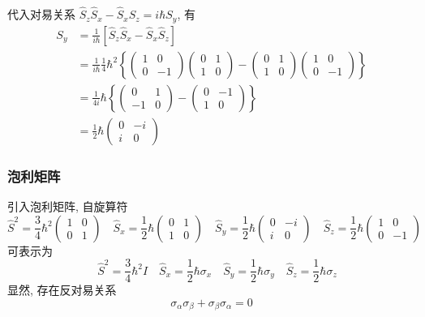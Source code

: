 \begin{frame}[label=current]
  \frametitle{}
代入对易关系 $ \hat{S}_z \hat{S}_x - \hat{S}_x \hat{S}_z = i\hbar S_y  $, 有
\[\begin{aligned}
  S_y &= \frac{1}{i\hbar} \left[\hat{S}_z \hat{S}_x - \hat{S}_x \hat{S}_z\right] \\
  &= \frac{1}{i\hbar} \frac{1}{4}\hbar^2 \left\{\begin{pmatrix}
    1 & 0\\
    0 & -1
   \end{pmatrix}\begin{pmatrix}
    0 & 1\\
    1 & 0
   \end{pmatrix}- \begin{pmatrix}
    0 & 1\\
    1 & 0
   \end{pmatrix} \begin{pmatrix}
    1 & 0\\
    0 & -1
   \end{pmatrix}\right\} \\
   &=\frac{1}{4i} \hbar \left\{\begin{pmatrix} 
    0 & 1\\
    -1 & 0
   \end{pmatrix}  - \begin{pmatrix} 
    0 & -1\\
    1 & 0
   \end{pmatrix} \right\} \\
   &= \frac{1}{2}\hbar \begin{pmatrix} 
    0 & -i\\
    i & 0
   \end{pmatrix}
\end{aligned}\]
\end{frame} 

\begin{frame}[label=current]
  \frametitle{泡利矩阵}
  引入泡利矩阵, 自旋算符
  \[\hat{S}^2 = \frac{3}{4}\hbar^2\begin{pmatrix}
    1 & 0\\
    0 & 1
   \end{pmatrix} \quad \hat{S}_x = \frac{1}{2}\hbar\begin{pmatrix}
    0 & 1\\
    1 & 0
   \end{pmatrix}\quad \hat{S}_y = \frac{1}{2}\hbar\begin{pmatrix}
    0 & -i\\
    i & 0
   \end{pmatrix}  \quad \hat{S}_z = \frac{1}{2}\hbar\begin{pmatrix}
    1 & 0\\
    0 & -1
   \end{pmatrix} \]
   可表示为 
   \[\quad \hat{S}^2 = \frac{3}{4}\hbar^2 I \quad \hat{S}_x = \frac{1}{2}\hbar\sigma _x \quad \hat{S}_y = \frac{1}{2}\hbar \sigma _y  \quad \hat{S}_z = \frac{1}{2}\hbar \sigma _z \]
   显然, 存在反对易关系
   \[\sigma _\alpha \sigma _\beta + \sigma _\beta \sigma _\alpha =0 \]
\end{frame} 


